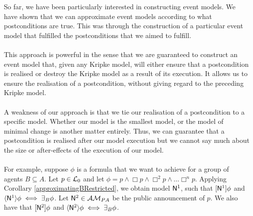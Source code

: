 So far, we have been particularly interested in constructing event models.
We have shown that we can approximate event models according to what
postconditions are true.
This was through the construction of a particular event model that fulfilled
the postconditions that we aimed to fulfill.\\
\\
This approach is powerful in the sense that we are guaranteed to construct an event model
that, given any Kripke model, will either ensure that a postcondition
is realised or destroy the Kripke model as a result of its execution.
It allows us to ensure the realisation of a postcondition, without giving
regard to the preceding Kripke model.\\
\\
A weakness of our approach is that we tie our realisation of a postcondition to a specific model.
Whether our model is the smallest model, or the model of minimal change is another matter entirely.
Thus, we can guarantee that a postcondition is realised after our model
execution but we cannot say much about the size or after-effects of the
execution of our model.\\
\\
For example, suppose $\phi$ is a formula that we want to achieve for a group of agents $B \subseteq
A$.
Let $p \in \mathcal{L}_0$ and let $\phi = p \land \Box p \land \Box^2 p \land \ldots \Box^n p$.
Applying Corollary \ref{approximatingBRestricted}, we obtain model $\mathrm{\mathsf{N}}^1$, such that $[{\mathrm{\mathsf{N}}^1}]\phi$
and $\langle { \ensuremath {\mathrm{\mathsf{N}}} ^1} \rangle\phi \iff \exists_B \phi$.
Let $\mathrm{\mathsf{N}}^2 \in \mathcal{AM}_{PA}$ be the public announcement of $p$.
We also have that $[{\mathrm{\mathsf{N}}^2}] \phi$ and $\langle { \ensuremath {\mathrm{\mathsf{N}}} ^2} \rangle \phi \iff \exists_B \phi$.

